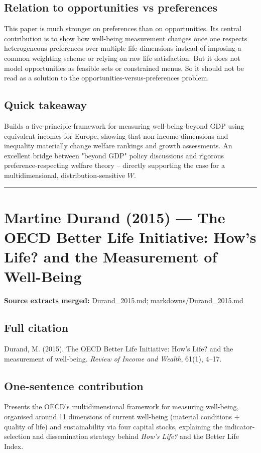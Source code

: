 \documentclass[11pt,a4paper]{article}
\begin{document}
\subsection*{Relation to opportunities vs preferences}
This paper is much stronger on preferences than on opportunities. Its central contribution is to show how well-being measurement changes once one respects heterogeneous preferences over multiple life dimensions instead of imposing a common weighting scheme or relying on raw life satisfaction. But it does not model opportunities as feasible sets or constrained menus. So it should not be read as a solution to the opportunities-versus-preferences problem.

\subsection*{Quick takeaway}
Builds a five-principle framework for measuring well-being beyond GDP using equivalent incomes for Europe, showing that non-income dimensions and inequality materially change welfare rankings and growth assessments. An excellent bridge between "beyond GDP" policy discussions and rigorous preference-respecting welfare theory -- directly supporting the case for a multidimensional, distribution-sensitive $W$.


\medskip\hrule\medskip

\section*{Martine Durand (2015) — The OECD Better Life Initiative: How’s Life? and the Measurement of Well-Being}

\textbf{Source extracts merged:} Durand\_2015.md; markdowns/Durand\_2015.md

\subsection*{Full citation}
Durand, M. (2015). The OECD Better Life Initiative: How's Life? and the measurement of well-being. \textit{Review of Income and Wealth}, 61(1), 4--17.

\subsection*{One-sentence contribution}
Presents the OECD's multidimensional framework for measuring well-being, organised around 11 dimensions of current well-being (material conditions + quality of life) and sustainability via four capital stocks, explaining the indicator-selection and dissemination strategy behind \textit{How's Life?} and the Better Life Index.
\end{document}
